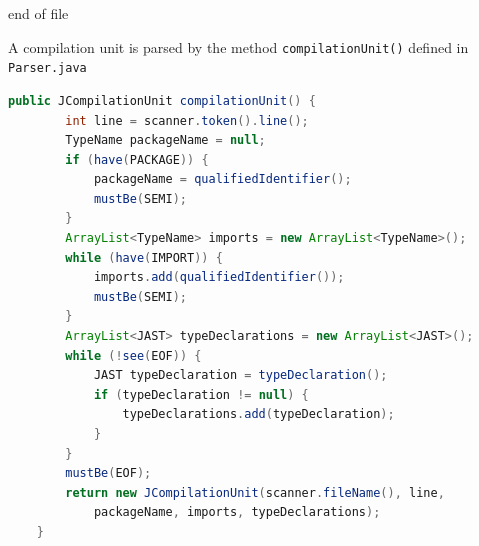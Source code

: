 \documentclass[8pt,a4paper,compress]{beamer}
\begin{document}
\begin{frame}[fragile]
\begin{overprint}
\begin{tcolorbox}[enhanced,drop shadow southwest,sharp corners,size=fbox,colback=white,fontlower=\small\ttfamily,collower=silver900]
\tcblower
\begin{minipage}[t][.25cm][t]{\textwidth}
end of file
\end{minipage}
\end{tcolorbox}
\end{overprint}
\end{frame}

\begin{frame}[fragile]
\pause

A compilation unit is parsed by the method \lstinline{compilationUnit()} defined in \lstinline{Parser.java}

\smallskip

\begin{overprint}
\begin{tcolorbox}[enhanced,drop shadow southwest,sharp corners,size=fbox,colback=white,fontlower=\small\ttfamily,collower=silver900]

\begin{lstlisting}[language=Java,style=focusin]
    public JCompilationUnit compilationUnit() {
        int line = scanner.token().line();
        TypeName packageName = null;
        if (have(PACKAGE)) {
            packageName = qualifiedIdentifier();
            mustBe(SEMI);
        }
        ArrayList<TypeName> imports = new ArrayList<TypeName>();
        while (have(IMPORT)) {
            imports.add(qualifiedIdentifier());
            mustBe(SEMI);
        }
        ArrayList<JAST> typeDeclarations = new ArrayList<JAST>();
        while (!see(EOF)) {
            JAST typeDeclaration = typeDeclaration();
            if (typeDeclaration != null) {
                typeDeclarations.add(typeDeclaration);
            }
        }
        mustBe(EOF);
        return new JCompilationUnit(scanner.fileName(), line, 
            packageName, imports, typeDeclarations);
    }
\end{lstlisting}

\tcblower
\begin{minipage}[t][.25cm][t]{\textwidth}

\end{minipage}
\end{tcolorbox}

\begin{tcolorbox}[enhanced,drop shadow southwest,sharp corners,size=fbox,colback=white,fontlower=\small\ttfamily,collower=silver900]


\end{tcolorbox}
\end{overprint}
\end{frame}
\end{document}
